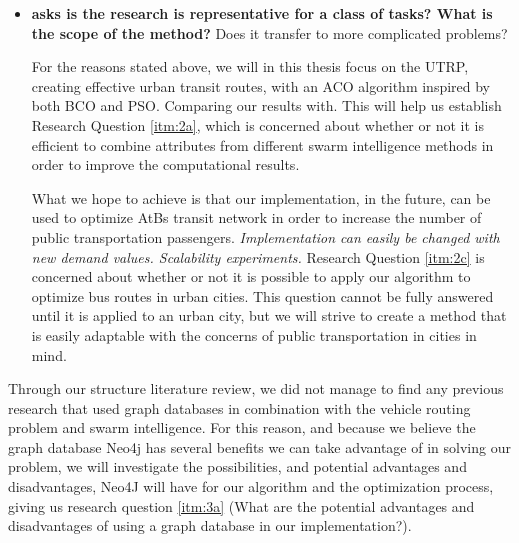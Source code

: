 \begin{itemize}
\item \citet{cohen88} \textbf{asks is the research is representative for a class of tasks? What is the scope of the method?}
Does it transfer to more complicated problems?

For the reasons stated above, we will in this thesis focus on the UTRP, creating effective urban transit routes, with an ACO algorithm inspired by both BCO and PSO. Comparing our results with. This will help us establish Research Question \vref{itm:2a}, which is concerned about whether or not it is efficient to combine attributes from different swarm intelligence methods in order to improve the computational results.

What we hope to achieve is that our implementation, in the future, can be used to optimize AtBs transit network in order to increase the number of public transportation passengers. \textit{Implementation can easily be changed with new demand values. Scalability experiments.} Research Question \vref{itm:2c} is concerned about whether or not it is possible to apply our algorithm to optimize bus routes in urban cities. This question cannot be fully answered until it is applied to an urban city, but we will strive to create a method that is easily adaptable with the concerns of public transportation in cities in mind.
\end{itemize}

Through our structure literature review, we did not manage to find any previous research that used graph databases in combination with the vehicle routing problem and swarm intelligence. For this reason, and because we believe the graph database Neo4j \citep{website:neo4j} has several benefits we can take advantage of in solving our problem, we will investigate the possibilities, and potential advantages and disadvantages, Neo4J will have for our algorithm and the optimization process, giving us research question \vref{itm:3a} (What are the potential advantages and disadvantages of using a graph database in our implementation?).